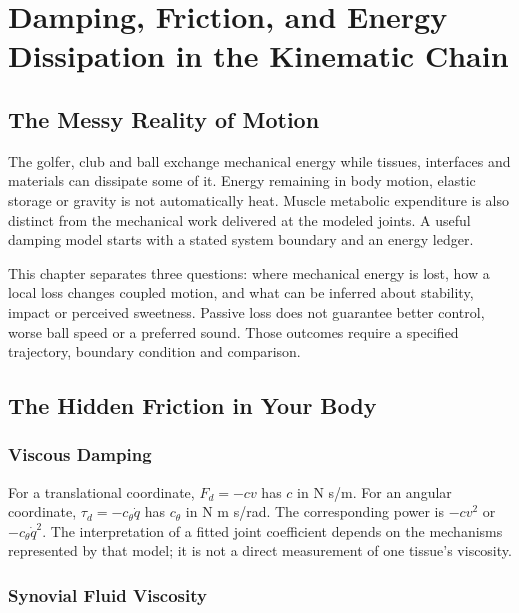 \chapter{Damping, Friction, and Energy Dissipation in the Kinematic Chain}
\label{ch:joint_damping_friction}

\section{The Messy Reality of Motion}\label{the-messy-reality-of-motion}

The golfer, club and ball exchange mechanical energy while tissues, interfaces and materials can dissipate some of it. Energy remaining in body motion, elastic storage or gravity is not automatically heat. Muscle metabolic expenditure is also distinct from the mechanical work delivered at the modeled joints. A useful damping model starts with a stated system boundary and an energy ledger.

This chapter separates three questions: where mechanical energy is lost, how a local loss changes coupled motion, and what can be inferred about stability, impact or perceived sweetness. Passive loss does not guarantee better control, worse ball speed or a preferred sound. Those outcomes require a specified trajectory, boundary condition and comparison.

\section{The Hidden Friction in Your
Body}\label{the-hidden-friction-in-your-body}

\subsection{Viscous Damping}\label{viscous-damping}

For a translational coordinate, \(F_d=-cv\) has \(c\) in N s/m. For an angular coordinate, \(\tau_d=-c_\theta\dot q\) has \(c_\theta\) in N m s/rad. The corresponding power is \(-cv^2\) or \(-c_\theta\dot q^2\). The interpretation of a fitted joint coefficient depends on the mechanisms represented by that model; it is not a direct measurement of one tissue's viscosity.

\subsection{Synovial Fluid Viscosity}\label{synovial-fluid-viscosity}

